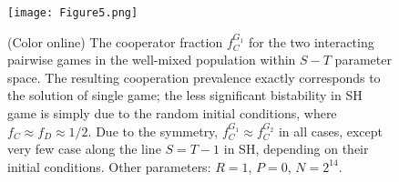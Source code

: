 \documentclass[showpacs,superscriptaddress,reprint,nofootinbib,amsmath,amssymb,aps,pre]{revtex4-1}
\begin{document}
\begin{figure}[b]
\centering
\texttt{[image: Figure5.png]}
\caption{(Color online)
The cooperator fraction $f^{G_1}_C$ for the two interacting pairwise games in the well-mixed population within $S-T$ parameter space. The resulting cooperation prevalence exactly corresponds to the solution of single game; the less significant bistability in SH game is simply due to the random initial conditions, where $f_C\approx f_D\approx 1/2$. 
Due to the symmetry, $f^{G_1}_C\approx f^{G_2}_C$ in all cases, except very few case along the line $S=T-1$ in SH, depending on their initial conditions. Other parameters: $R=1$, $P=0$, $N=2^{14}$. 
}
\label{fig:wellmixed}
\end{figure}

\end{document}
